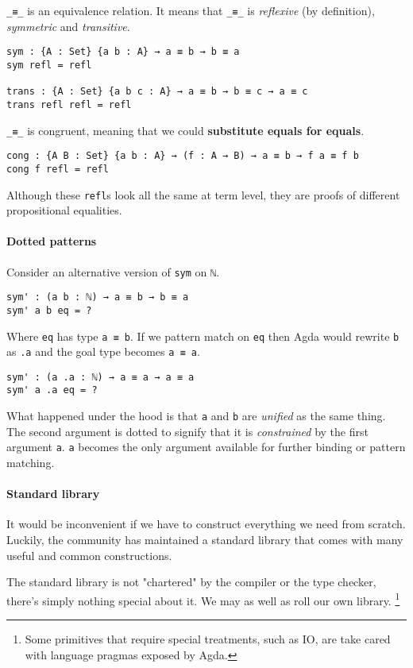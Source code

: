 \documentclass[../thesis.tex]{subfiles}
\begin{document}
{\lstinline|_≡_|} is an equivalence relation. It means that {\lstinline|_≡_|}
is \textit{reflexive} (by definition), \textit{symmetric} and \textit{transitive}.

\begin{lstlisting}
sym : {A : Set} {a b : A} → a ≡ b → b ≡ a
sym refl = refl

trans : {A : Set} {a b c : A} → a ≡ b → b ≡ c → a ≡ c
trans refl refl = refl
\end{lstlisting}

{\lstinline|_≡_|} is congruent, meaning that we could \textbf{substitute equals for equals}.

\begin{lstlisting}
cong : {A B : Set} {a b : A} → (f : A → B) → a ≡ b → f a ≡ f b
cong f refl = refl
\end{lstlisting}

Although these {\lstinline|refl|}s look all the same at term level, they
are proofs of different propositional equalities.

\paragraph{Dotted patterns}

Consider an alternative version of {\lstinline|sym|} on {\lstinline|ℕ|}.

\begin{lstlisting}
sym' : (a b : ℕ) → a ≡ b → b ≡ a
sym' a b eq = ?
\end{lstlisting}

Where {\lstinline|eq|} has type {\lstinline|a ≡ b|}.
If we pattern match on {\lstinline|eq|} then Agda would rewrite {\lstinline|b|}
as {\lstinline|.a|} and the goal type becomes {\lstinline|a ≡ a|}.

\begin{lstlisting}
sym' : (a .a : ℕ) → a ≡ a → a ≡ a
sym' a .a eq = ?
\end{lstlisting}

What happened under the hood is that {\lstinline|a|} and {\lstinline|b|} are
\textit{unified} as the same thing. The second argument is dotted to signify that
it is \textit{constrained} by the first argument {\lstinline|a|}. {\lstinline|a|}
becomes the only argument available for further binding or pattern matching.

\paragraph{Standard library}

It would be inconvenient if we have to construct everything we need from scratch.
Luckily, the community has maintained a standard library that comes with many useful
and common constructions.

The standard library is not "chartered" by the compiler or the type checker,
there's simply nothing special about it. We may as well as roll our own library.
\footnote{Some primitives that require special treatments, such as IO, are take cared with
language pragmas exposed by Agda.}
\end{document}
